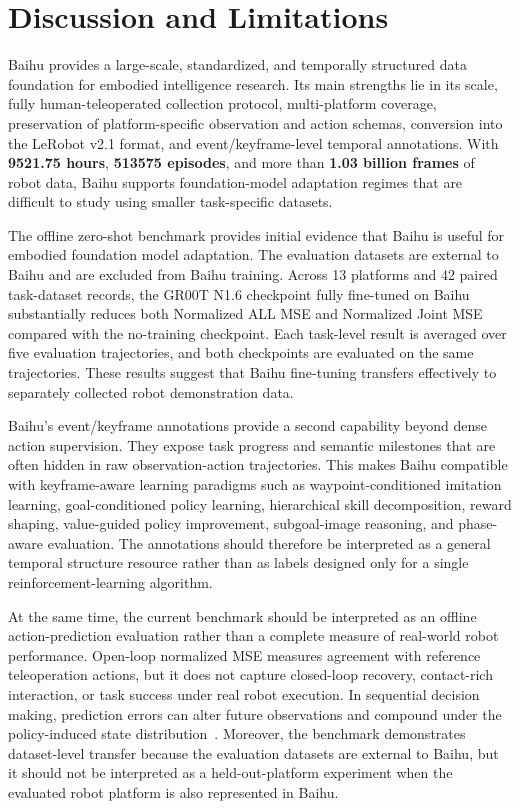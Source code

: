 \section{Discussion and Limitations}

Baihu provides a large-scale, standardized, and temporally structured data foundation for embodied intelligence research. Its main strengths lie in its scale, fully human-teleoperated collection protocol, multi-platform coverage, preservation of platform-specific observation and action schemas, conversion into the LeRobot v2.1 format, and event/keyframe-level temporal annotations. With \textbf{9521.75 hours}, \textbf{513575 episodes}, and more than \textbf{1.03 billion frames} of robot data, Baihu supports foundation-model adaptation regimes that are difficult to study using smaller task-specific datasets.

The offline zero-shot benchmark provides initial evidence that Baihu is useful for embodied foundation model adaptation. The evaluation datasets are external to Baihu and are excluded from Baihu training. Across 13 platforms and 42 paired task-dataset records, the GR00T N1.6 checkpoint fully fine-tuned on Baihu substantially reduces both Normalized ALL MSE and Normalized Joint MSE compared with the no-training checkpoint. Each task-level result is averaged over five evaluation trajectories, and both checkpoints are evaluated on the same trajectories. These results suggest that Baihu fine-tuning transfers effectively to separately collected robot demonstration data.

Baihu's event/keyframe annotations provide a second capability beyond dense action supervision. They expose task progress and semantic milestones that are often hidden in raw observation-action trajectories. This makes Baihu compatible with keyframe-aware learning paradigms such as waypoint-conditioned imitation learning, goal-conditioned policy learning, hierarchical skill decomposition, reward shaping, value-guided policy improvement, subgoal-image reasoning, and phase-aware evaluation. The annotations should therefore be interpreted as a general temporal structure resource rather than as labels designed only for a single reinforcement-learning algorithm.

At the same time, the current benchmark should be interpreted as an offline action-prediction evaluation rather than a complete measure of real-world robot performance. Open-loop normalized MSE measures agreement with reference teleoperation actions, but it does not capture closed-loop recovery, contact-rich interaction, or task success under real robot execution. In sequential decision making, prediction errors can alter future observations and compound under the policy-induced state distribution~\cite{ross2011dagger,zhao2023aloha}. Moreover, the benchmark demonstrates dataset-level transfer because the evaluation datasets are external to Baihu, but it should not be interpreted as a held-out-platform experiment when the evaluated robot platform is also represented in Baihu.


